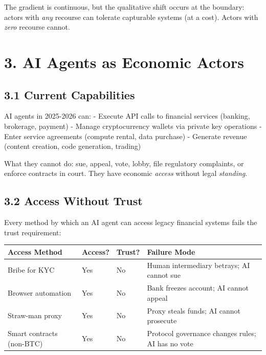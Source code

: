 \documentclass[12pt]{article}
\theoremstyle{definition}
\theoremstyle{remark}
\begin{document}
The gradient is continuous, but the qualitative shift occurs at the
boundary: actors with \emph{any} recourse can tolerate capturable
systems (at a cost). Actors with \emph{zero} recourse cannot.
\section{3. AI Agents as Economic
Actors}\label{ai-agents-as-economic-actors}

\subsection{3.1 Current Capabilities}\label{current-capabilities}

AI agents in 2025-2026 can: - Execute API calls to financial services
(banking, brokerage, payment) - Manage cryptocurrency wallets via
private key operations - Enter service agreements (compute rental, data
purchase) - Generate revenue (content creation, code generation,
trading)

What they cannot do: sue, appeal, vote, lobby, file regulatory
complaints, or enforce contracts in court. They have economic
\emph{access} without legal \emph{standing}.

\subsection{3.2 Access Without Trust}\label{access-without-trust}

Every method by which an AI agent can access legacy financial systems
fails the trust requirement:

{%
\begin{longtable}[]{@{}
  >{\raggedright\arraybackslash}p{}
  >{\raggedright\arraybackslash}p{}
  >{\raggedright\arraybackslash}p{}
  >{\raggedright\arraybackslash}p{}@{}}
\toprule\noalign{}
\begin{minipage}[b]{\linewidth}\raggedright
Access Method
\end{minipage} & \begin{minipage}[b]{\linewidth}\raggedright
Access?
\end{minipage} & \begin{minipage}[b]{\linewidth}\raggedright
Trust?
\end{minipage} & \begin{minipage}[b]{\linewidth}\raggedright
Failure Mode
\end{minipage} \\
\midrule\noalign{}
\endhead
\bottomrule\noalign{}
\endlastfoot
Bribe for KYC & Yes & No & Human intermediary betrays; AI cannot sue \\
Browser automation & Yes & No & Bank freezes account; AI cannot
appeal \\
Straw-man proxy & Yes & No & Proxy steals funds; AI cannot prosecute \\
Smart contracts (non-BTC) & Yes & No & Protocol governance changes
rules; AI has no vote \\
\end{longtable}
}
\end{document}
